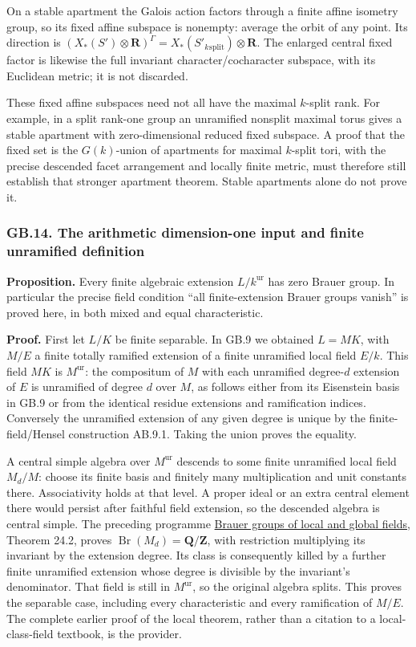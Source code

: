 \documentclass[
  11pt,
]{article}
\begin{document}
On a stable apartment the Galois action factors through a finite affine
isometry group, so its fixed affine subspace is nonempty: average the
orbit of any point. Its direction is
\((X_*(S')\otimes\mathbf R)^\Gamma=X_*(S'_k{}_{\mathrm{split}})\otimes\mathbf R\).
The enlarged central fixed factor is likewise the full invariant
character/cocharacter subspace, with its Euclidean metric; it is not
discarded.

These fixed affine subspaces need not all have the maximal \(k\)-split
rank. For example, in a split rank-one group an unramified nonsplit
maximal torus gives a stable apartment with zero-dimensional reduced
fixed subspace. A proof that the fixed set is the \(G(k)\)-union of
apartments for maximal \(k\)-split tori, with the precise descended
facet arrangement and locally finite metric, must therefore still
establish that stronger apartment theorem. Stable apartments alone do
not prove it.

\subsubsection{GB.14. The arithmetic dimension-one input and finite
unramified
definition}\label{gb.14.-the-arithmetic-dimension-one-input-and-finite-unramified-definition}

\textbf{Proposition.} Every finite algebraic extension
\(L/k^{\mathrm{ur}}\) has zero Brauer group. In particular the precise
field condition ``all finite-extension Brauer groups vanish'' is proved
here, in both mixed and equal characteristic.

\textbf{Proof.} First let \(L/K\) be finite separable. In GB.9 we
obtained \(L=MK\), with \(M/E\) a finite totally ramified extension of a
finite unramified local field \(E/k\). This field \(MK\) is
\(M^{\mathrm{ur}}\): the compositum of \(M\) with each unramified
degree-\(d\) extension of \(E\) is unramified of degree \(d\) over
\(M\), as follows either from its Eisenstein basis in GB.9 or from the
identical residue extensions and ramification indices. Conversely the
unramified extension of any given degree is unique by the
finite-field/Hensel construction AB.9.1. Taking the union proves the
equality.

A central simple algebra over \(M^{\mathrm{ur}}\) descends to some
finite unramified local field \(M_d/M\): choose its finite basis and
finitely many multiplication and unit constants there. Associativity
holds at that level. A proper ideal or an extra central element there
would persist after faithful field extension, so the descended algebra
is central simple. The preceding programme
\href{../NT-CFT/brauer-groups-of-local-and-global-fields.html}{Brauer
groups of local and global fields}, Theorem 24.2, proves
\(\operatorname {Br}(M_d)=\mathbf Q/\mathbf Z\), with restriction
multiplying its invariant by the extension degree. Its class is
consequently killed by a further finite unramified extension whose
degree is divisible by the invariant's denominator. That field is still
in \(M^{\mathrm{ur}}\), so the original algebra splits. This proves the
separable case, including every characteristic and every ramification of
\(M/E\). The complete earlier proof of the local theorem, rather than a
citation to a local-class-field textbook, is the provider.
\end{document}
